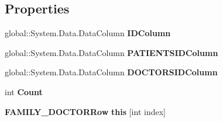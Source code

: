 \subsection*{Properties}
\begin{CompactItemize}
\item 
global::System.Data.DataColumn \textbf{IDColumn}\hspace{0.3cm}{\tt  [get]}\label{class_automatic_medical_system_1_1_data_set1_1_1_f_a_m_i_l_y___d_o_c_t_o_r_data_table_433cf922578b369f2cc5431aa0316a3d}

\item 
global::System.Data.DataColumn \textbf{PATIENTSIDColumn}\hspace{0.3cm}{\tt  [get]}\label{class_automatic_medical_system_1_1_data_set1_1_1_f_a_m_i_l_y___d_o_c_t_o_r_data_table_565cc189778225cca497d3c17d0532ed}

\item 
global::System.Data.DataColumn \textbf{DOCTORSIDColumn}\hspace{0.3cm}{\tt  [get]}\label{class_automatic_medical_system_1_1_data_set1_1_1_f_a_m_i_l_y___d_o_c_t_o_r_data_table_9bec6f5ec3b2acfbab70d912c63e801f}

\item 
int \textbf{Count}\hspace{0.3cm}{\tt  [get]}\label{class_automatic_medical_system_1_1_data_set1_1_1_f_a_m_i_l_y___d_o_c_t_o_r_data_table_e6214904ab2888023bd7a6760530b33e}

\item 
{\bf FAMILY\_\-DOCTORRow} \textbf{this} [int index]\hspace{0.3cm}{\tt  [get]}\label{class_automatic_medical_system_1_1_data_set1_1_1_f_a_m_i_l_y___d_o_c_t_o_r_data_table_8d0bf46b6692a1dacfc131b42c7b9a4f}

\end{CompactItemize}
